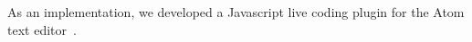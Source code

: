As an implementation, we developed a Javascript live coding plugin for the Atom text editor~\cite{Atom}.





